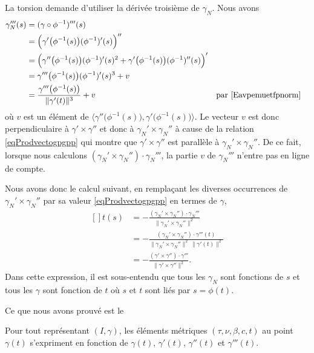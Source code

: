 La torsion demande d'utiliser la dérivée troisième de $\gamma_N$. Nous avons
\begin{equation}
    \begin{aligned}[]
        \gamma_N'''(s)&=(\gamma\circ\phi^{-1})'''(s)\\
        &=\Big( \gamma'\big( \phi^{-1}(s) \big)(\phi^{-1})'(s) \Big)''\\
        &=\Big( \gamma''\big( \phi^{-1}(s) \big)(\phi^{-1})'(s)^2+\gamma'\big( \phi^{-1}(s) \big)(\phi^{-1})''(s) \Big)'\\
        &=\gamma'''\big( \phi^{-1}(s) \big)(\phi^{-1})'(s)^3+ v\\
        &=\frac{ \gamma'''\big( \phi^{-1}(s) \big) }{ \| \gamma'(t) \|^3 }+v&&\text{par \eqref{Eavpemuetfpnorm}}
    \end{aligned}
\end{equation}
où $v$ est un élément de $\langle \gamma''\big( \phi^{-1}(s) \big),\gamma'\big( \phi^{-1}(s) \big)\rangle$. Le vecteur $v$ est donc perpendiculaire à $\gamma'\times \gamma''$ et donc à $\gamma_N'\times \gamma_N''$ à cause de la relation \eqref{eqProdvectogpgpp} qui montre que $\gamma'\times \gamma''$ est parallèle à $\gamma_N'\times \gamma_N''$. De ce fait, lorsque nous calculons $(\gamma_N'\times \gamma_N'')\cdot \gamma_N'''$, la partie $v$ de $\gamma_N'''$ n'entre pas en ligne de compte.

Nous avons donc le calcul suivant, en remplaçant les diverses occurrences de $\gamma_N'\times \gamma_N''$ par sa valeur \eqref{eqProdvectogpgpp} en termes de $\gamma$,
\begin{equation}
    \begin{aligned}[]
        t(s)&=-\frac{ (\gamma_N'\times \gamma_N'')\cdot \gamma_N''' }{ \| \gamma_N'\times \gamma_N'' \|^2 }\\
        &=-\frac{ (\gamma_N'\times \gamma_N'')\cdot \gamma'''(t) }{ \| \gamma_N'\times \gamma_N'' \|^2\,\| \gamma'(t) \|^2 }\\
        &=-\frac{ (\gamma'\times \gamma'')\cdot \gamma''' }{ \| \gamma'\times \gamma'' \|^2 }.
    \end{aligned}
\end{equation}
Dans cette expression, il est sous-entendu que tous les $\gamma_N$ sont fonctions de $s$ et tous les $\gamma$ sont fonction de $t$ où $s$ et $t$ sont liés par $s=\phi(t)$.

Ce que nous avons prouvé est le 
\begin{theorem}
    Pour tout représentant $(I,\gamma)$, les éléments métriques $(\tau,\nu,\beta,c,t)$ au point $\gamma(t)$ s'expriment en fonction de $\gamma(t)$, $\gamma'(t)$, $\gamma''(t)$ et $\gamma'''(t)$.
\end{theorem}

